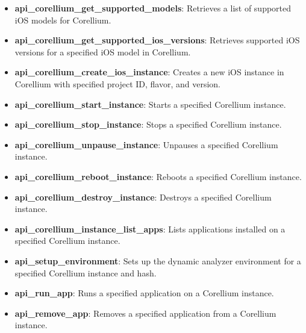 \documentclass{report}
\begin{document}
\begin{itemize}
\begin{itemize}
\begin{itemize}
\begin{itemize}
                    \item \textbf{api\_corellium\_get\_supported\_models}: Retrieves a list of supported iOS models for Corellium.
                    
                    \item \textbf{api\_corellium\_get\_supported\_ios\_versions}: Retrieves supported iOS versions for a specified iOS model in Corellium.
                    
                    \item \textbf{api\_corellium\_create\_ios\_instance}: Creates a new iOS instance in Corellium with specified project ID, flavor, and version.
                    
                    \item \textbf{api\_corellium\_start\_instance}: Starts a specified Corellium instance.
                    
                    \item \textbf{api\_corellium\_stop\_instance}: Stops a specified Corellium instance.
                    
                    \item \textbf{api\_corellium\_unpause\_instance}: Unpauses a specified Corellium instance.
                    
                    \item \textbf{api\_corellium\_reboot\_instance}: Reboots a specified Corellium instance.
                    
                    \item \textbf{api\_corellium\_destroy\_instance}: Destroys a specified Corellium instance.
                    
                    \item \textbf{api\_corellium\_instance\_list\_apps}: Lists applications installed on a specified Corellium instance.
                    
                    \item \textbf{api\_setup\_environment}: Sets up the dynamic analyzer environment for a specified Corellium instance and hash.
                    
                    \item \textbf{api\_run\_app}: Runs a specified application on a Corellium instance.
                    
                    \item \textbf{api\_remove\_app}: Removes a specified application from a Corellium instance.
                    

\end{itemize}
\end{itemize}
\end{itemize}
\end{itemize}
\end{document}
